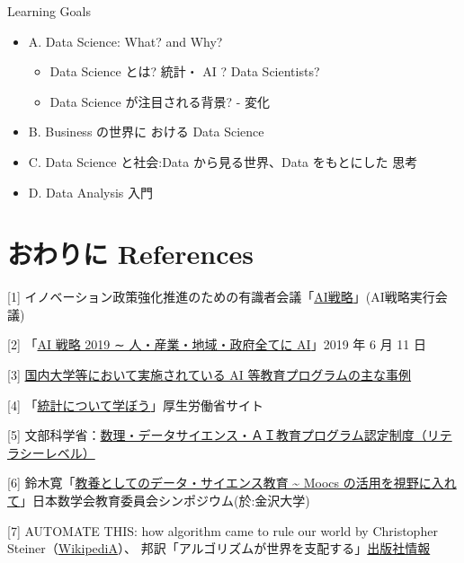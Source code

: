 \documentclass[
]{book}
\providecommand{\tightlist}{%
  \setlength{\itemsep}{0pt}\setlength{\parskip}{0pt}}
\theoremstyle{definition}
\theoremstyle{definition}
\theoremstyle{definition}
\theoremstyle{definition}
\theoremstyle{remark}
\begin{document}
Learning Goals

\begin{itemize}
\tightlist
\item
  A. Data Science: What? and Why?

  \begin{itemize}
  \tightlist
  \item
    Data Science とは? 統計・ AI ? Data Scientists?
  \item
    Data Science が注目される背景? - 変化
  \end{itemize}
\item
  B. Business の世界に おける Data Science
\item
  C. Data Science と社会:Data から見る世界、Data をもとにした 思考
\item
  D. Data Analysis 入門
\end{itemize}

\hypertarget{ux304aux308fux308aux306b-references}{%
\section{おわりに References}\label{ux304aux308fux308aux306b-references}}

{[}1{]} イノベーション政策強化推進のための有識者会議「\href{https://www8.cao.go.jp/cstp/ai/index.html}{AI戦略}」(AI戦略実行会議)

{[}2{]} 「\href{https://www5.cao.go.jp/keizai-shimon/kaigi/special/reform/wg7/20191101/shiryou1.pdf}{AI 戦略 2019 ∼ 人・産業・地域・政府全てに AI}」2019 年 6 月 11 日

{[}3{]} \href{https://www8.cao.go.jp/cstp/ai/suuri/r1_1kai/r1_1kai.html}{国内大学等において実施されている AI 等教育プログラムの主な事例}

{[}4{]} 「\href{https://www.mhlw.go.jp/toukei/learning/index.html}{統計について学ぼう}」厚生労働省サイト

{[}5{]} 文部科学省：\href{https://www.mext.go.jp/a_menu/koutou/suuri_datascience_ai/00002.htm}{数理・データサイエンス・ＡＩ教育プログラム認定制度（リテラシーレベル）}

{[}6{]} 鈴木寛「\href{https://icu-hsuzuki.github.io/science/index-j.html\#msj2019}{教養としてのデータ・サイエンス教育 \textasciitilde{} Moocs の活用を視野に入れて}」日本数学会教育委員会シンポジウム(於:金沢大学)

{[}7{]} AUTOMATE THIS: how algorithm came to rule our world by Christopher Steiner（\href{https://en.wikipedia.org/wiki/Automate_This}{WikipediA}）、 邦訳「アルゴリズムが世界を支配する」\href{https://www.kadokawa.co.jp/product/321306000181/}{出版社情報}
\end{document}
